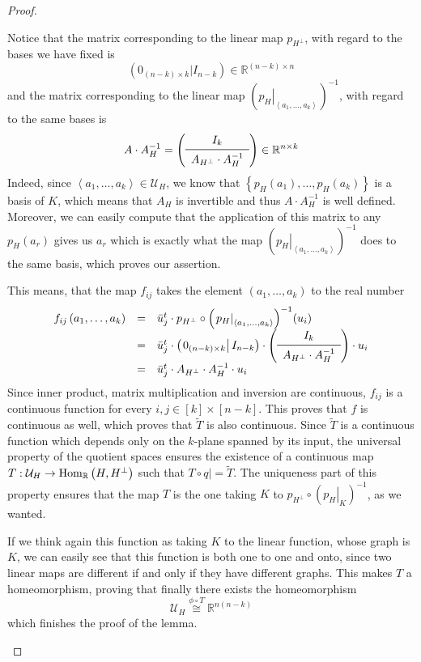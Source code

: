 \begin{proof}
\begin{b_item}
Notice that the matrix corresponding to the linear map $p_{H^{\perp}}$, with regard to the bases we have fixed is
\[\left(0_{(n-k)\times k}|I_{n-k}\right)\in\mathbb{R}^{(n-k)\times n}\]
and the matrix corresponding to the linear map ${\left(\left.p_H\right|_{\left<a_1,\ldots,a_k\right>}\right)}^{-1}$, with regard to the same bases is
\[A\cdot A_H^{-1}=\left(\begin{array}{c}
I_k\\
\midrule
A_{H^{\perp}}\cdot A_H^{-1}\\
\end{array}\right)
\in\mathbb{R}^{n\times{k}}\]
Indeed, since $\left<a_1,\ldots,a_k\right>\in\mathcal{U}_H$, we know that $\left\{p_H(a_1),\ldots,p_H(a_k)\right\}$ is a basis of $K$, which means that $A_H$ is invertible and thus $A\cdot A_H^{-1}$ is well defined. Moreover, we can easily compute that the application of this matrix to any $p_H(a_r)$ gives us $a_r$ which is exactly what the map ${\left({\left.p_H\right|}_{\left<a_1,\ldots,a_k\right>}\right)}^{-1}$ does to the same basis, which proves our assertion.

This means, that the map $f_{ij}$ takes the element $\left(a_1,\ldots,a_k\right)$ to the real number
\[\begin{array}{rcl}f_{ij}\left(a_1,\ldots,a_k\right)
&=&\bar{u}_j^t\cdot p_{H^{\perp}}\circ{\left(\left.p_H\right|_{\left<a_1,\ldots,a_k\right>}\right)}^{-1}(u_i)\\
&=&\bar{u}_j^t\cdot\left(\left.0_{(n-k)\times k}\right|I_{n-k}\right)\cdot\left(\begin{array}{c}I_k\\\midrule A_{H^{\perp}}\cdot A_H^{-1}\\\end{array}\right)\cdot u_i\\
&=&\bar{u}_j^t\cdot A_{H^{\perp}}\cdot A_H^{-1}\cdot u_i\\
\end{array}\]
Since inner product, matrix multiplication and inversion are continuous, $f_{ij}$ is a continuous function for every $i,j\in[k]\times[n-k]$. This proves that $f$ is continuous as well, which proves that $\tilde T$ is also continuous. Since $\tilde T$ is a continuous function which depends only on the $k$-plane spanned by its input, the universal property of the quotient spaces ensures the existence of a continuous map $T:\mathcal{U}_H\to\mathrm{Hom}_{\mathbb{R}}\left(H,H^{\perp}\right)$ such that $T\circ \left.q\right|=\tilde T$. The uniqueness part of this property ensures that the map $T$ is the one taking $K$ to $p_{H^{\perp}}\circ{\left(\left.p_H\right|_K\right)}^{-1}$, as we wanted.

If we think again this function as taking $K$ to the linear function, whose graph is $K$, we can easily see that this function is both one to one and onto, since two linear maps are different if and only if they have different graphs. This makes $T$ a homeomorphism, proving that finally there exists the homeomorphism
\[\mathcal{U}_H\overset{\phi\circ T}{\cong}\mathbb{R}^{n(n-k)}\]
which finishes the proof of the lemma.\qedhere
\end{b_item}
\end{proof}
